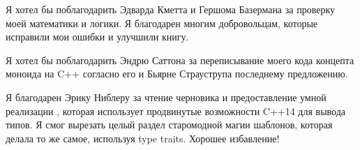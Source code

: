 \noindent
Я хотел бы поблагодарить Эдварда Кметта и Гершома Базермана за проверку моей математики
и логики. Я благодарен многим добровольцам, которые исправили мои ошибки и улучшили книгу.

\vspace{1.0em}
\noindent
Я хотел бы поблагодарить Эндрю Саттона за переписывание моего кода концепта моноида на C++
согласно его и Бьярне Страуструпа последнему предложению.

\vspace{1.0em}
\noindent
Я благодарен Эрику Ниблеру за чтение черновика и предоставление
умной реализации , которая использует продвинутые возможности
C++14 для вывода типов. Я смог вырезать целый раздел
старомодной магии шаблонов, которая делала то же самое, используя type traits.
Хорошее избавление!